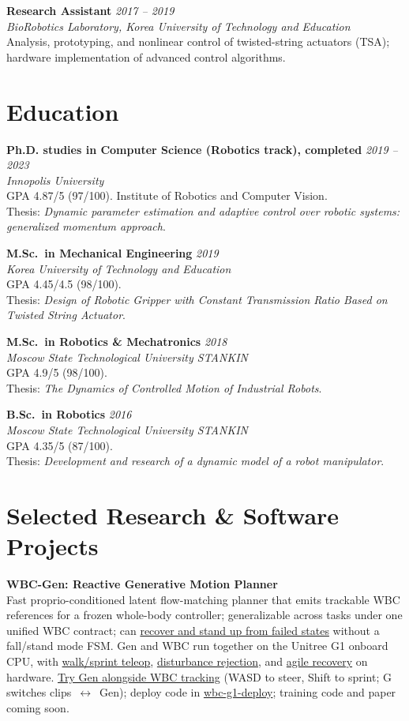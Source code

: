 \documentclass[11pt,a4paper]{article}
\newcommand{\cventry}[4]{%
  \textbf{#1} \hfill \textit{#2}\\
  \textit{#3}\\
  #4\par\vspace{0.25em}
}
\begin{document}
\cventry{Research Assistant}{2017 -- 2019}{BioRobotics Laboratory, Korea University of Technology and Education}{%
  Analysis, prototyping, and nonlinear control of twisted-string actuators (TSA); hardware implementation of advanced control algorithms.}

\section{Education}

\cventry{Ph.D. studies in Computer Science (Robotics track), completed}{2019 -- 2023}{Innopolis University}{GPA 4.87/5 (97/100). Institute of Robotics and Computer Vision.\\
Thesis: \emph{Dynamic parameter estimation and adaptive control over robotic systems: generalized momentum approach}.}

\cventry{M.Sc.\ in Mechanical Engineering}{2019}{Korea University of Technology and Education}{GPA 4.45/4.5 (98/100).\\
Thesis: \emph{Design of Robotic Gripper with Constant Transmission Ratio Based on Twisted String Actuator}.}

\cventry{M.Sc.\ in Robotics \& Mechatronics}{2018}{Moscow State Technological University STANKIN}{GPA 4.9/5 (98/100).\\
Thesis: \emph{The Dynamics of Controlled Motion of Industrial Robots}.}

\cventry{B.Sc.\ in Robotics}{2016}{Moscow State Technological University STANKIN}{GPA 4.35/5 (87/100).\\
Thesis: \emph{Development and research of a dynamic model of a robot manipulator}.}

\section{Selected Research \& Software Projects}

\textbf{WBC-Gen: Reactive Generative Motion Planner}\\
Fast proprio-conditioned latent flow-matching planner that emits trackable WBC references for a frozen whole-body controller; generalizable across tasks under one unified WBC contract; can \href{https://youtu.be/gAHCAtJnRDU}{recover and stand up from failed states} without a fall/stand mode FSM. Gen and WBC run together on the Unitree G1 onboard CPU, with \href{https://youtube.com/shorts/dXNI8benYAo}{walk/sprint teleop}, \href{https://youtube.com/shorts/iofTKa0GPwQ}{disturbance rejection}, and \href{https://youtube.com/shorts/aMezmX262tg}{agile recovery} on hardware. \href{https://wbc-mjlab.github.io/wbc-demo/}{Try Gen alongside WBC tracking} (WASD to steer, Shift to sprint; G switches clips~$\leftrightarrow$~Gen); deploy code in \href{https://github.com/wbc-mjlab/wbc-g1-deploy/tree/feat/generator}{wbc-g1-deploy}; training code and paper coming soon.
\end{document}
